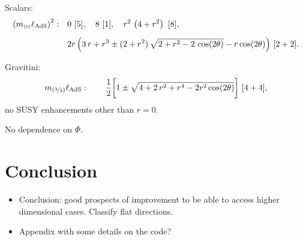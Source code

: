 \documentclass[11pt]{article}
\def\sst#1{{\scriptscriptstyle #1}}
\begin{document}
Scalars:
\begin{equation}
 \begin{aligned}	
	\left(m_{\sst{(0)}}\ell_{\rm AdS}\right)^2:\quad&
	0\ [5],	\quad
	8\ [1],	\quad
	r^{2}\,\left(4+r^2\right)\ [8],	\\[5pt]
	&	2r\,\Big(3\,r+r^{3}\pm(2+r^{2})\,\sqrt{2+r^2-2\,\cos(2\theta)}-r\cos(2\theta)\Big)\ [2+2].
 \end{aligned}
\end{equation}

Gravitini:
\begin{equation}
	m_{{(\nicefrac32)}}\ell_{\rm AdS}:\quad 
	\quad \dfrac1{2}\bigg[1\pm\sqrt{4+2\,r^{2}+r^{4}-2r^{2}\cos(2\theta)}\bigg]\ [4+4],
\end{equation}
no SUSY enhancements other than $r=0$.

No dependence on $\Phi$.

\section{Conclusion}
\begin{itemize}[label=\textbullet]
	\item Conclusion: good prospects of improvement to be able to access higher dimensional cases. Classify flat directions.
	\item Appendix with some details on the code?
\end{itemize}



\end{document}
